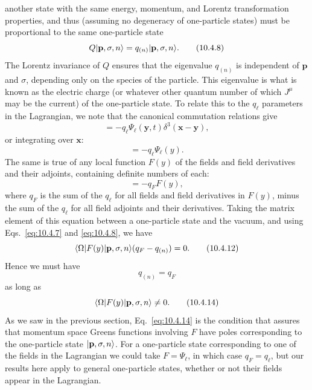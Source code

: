 another state with the same energy, momentum, and Lorentz transformation
properties, and thus (assuming no degeneracy of one-particle states) must be
proportional to the same one-particle state
\begin{equation}
Q\lvert \mathbf p,\sigma,n\rangle=q_{(n)}\lvert \mathbf p,\sigma,n\rangle.
\tag{10.4.8}\label{eq:10.4.8}
\end{equation}
The Lorentz invariance of $Q$ ensures that the eigenvalue $q_{(n)}$ is
independent of $\mathbf p$ and $\sigma$, depending only on the species of the
particle. This eigenvalue is what is known as the electric charge (or whatever
other quantum number of which $J^\mu$ may be the current) of the one-particle
state. To relate this to the $q_\ell$ parameters in the Lagrangian, we note that
the canonical commutation relations give
\begin{equation}
[J^0(\mathbf x,t),\Psi_\ell(\mathbf y,t)]
=-q_\ell\Psi_\ell(\mathbf y,t)\delta^3(\mathbf x-\mathbf y),
\tag{10.4.9}\label{eq:10.4.9}
\end{equation}
or integrating over $\mathbf x$:
\begin{equation}
[Q,\Psi_\ell(y)]=-q_\ell\Psi_\ell(y).
\tag{10.4.10}\label{eq:10.4.10}
\end{equation}
The same is true of any local function $F(y)$ of the fields and field
derivatives and their adjoints, containing definite numbers of each:
\begin{equation}
[Q,F(y)]=-q_FF(y),
\tag{10.4.11}\label{eq:10.4.11}
\end{equation}
where $q_F$ is the sum of the $q_\ell$ for all fields and field derivatives in
$F(y)$, minus the sum of the $q_\ell$ for all field adjoints and their
derivatives. Taking the matrix element of this equation between a one-particle
state and the vacuum, and using Eqs.~\eqref{eq:10.4.7} and
\eqref{eq:10.4.8}, we have
\begin{equation}
\langle \Omega\rvert F(y)\lvert \mathbf p,\sigma,n\rangle(q_F-q_{(n)})=0.
\tag{10.4.12}\label{eq:10.4.12}
\end{equation}
Hence we must have
\begin{equation}
q_{(n)}=q_F
\tag{10.4.13}\label{eq:10.4.13}
\end{equation}
as long as
\begin{equation}
\langle \Omega\rvert F(y)\lvert \mathbf p,\sigma,n\rangle\ne0.
\tag{10.4.14}\label{eq:10.4.14}
\end{equation}
As we saw in the previous section, Eq.~\eqref{eq:10.4.14} is the condition
that assures that momentum space Greens functions involving $F$ have poles
corresponding to the one-particle state $\lvert \mathbf p,\sigma,n\rangle$. For a
one-particle state corresponding to one of the fields in the Lagrangian we
could take $F=\Psi_\ell$, in which case $q_F=q_\ell$, but our results here
apply to general one-particle states, whether or not their fields appear in the
Lagrangian.

